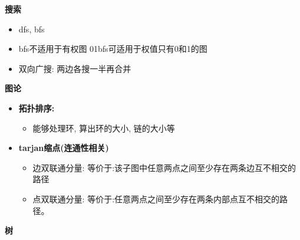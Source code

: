 \textbf{搜索}

\begin{itemize}
    \item dfs, bfs
    \item bfs不适用于有权图 01bfs可适用于权值只有0和1的图
    \item 双向广搜: 两边各搜一半再合并
\end{itemize}

\textbf{图论}

\begin{itemize}
    \item \textbf{拓扑排序:}
    \begin{itemize}
        \item 能够处理环, 算出环的大小, 链的大小等
    \end{itemize}
    
    \item \textbf{tarjan缩点(连通性相关)}
    \begin{itemize}
        \item 边双联通分量: 等价于:该子图中任意两点之间至少存在两条边互不相交的路径
        \item 点双联通分量: 等价于:任意两点之间至少存在两条内部点互不相交的路径。
    \end{itemize}
\end{itemize}

\textbf{树}

